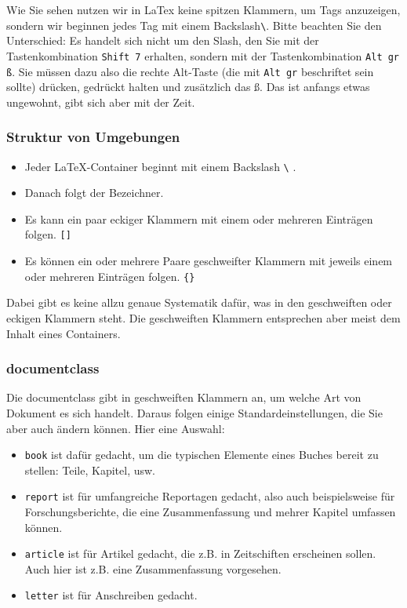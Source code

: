 Wie Sie sehen nutzen wir in LaTex keine spitzen Klammern, um Tags anzuzeigen, sondern wir beginnen jedes \glqq{}Tag\grqq{} mit einem Backslash\verb|\|. Bitte beachten Sie den Unterschied: Es handelt sich nicht um den Slash, den Sie mit der Tastenkombination \verb|Shift 7| erhalten, sondern mit der Tastenkombination \verb|Alt gr ß|. Sie müssen dazu also die rechte Alt-Taste (die mit \verb|Alt gr| beschriftet sein sollte) drücken, gedrückt halten und zusätzlich das ß. Das ist anfangs etwas ungewohnt, gibt sich aber mit der Zeit.\\

\subsubsection{Struktur von Umgebungen}

\begin{itemize}
	\item Jeder LaTeX-Container beginnt mit einem Backslash \verb|\| .
	\item Danach folgt der Bezeichner.
	\item Es kann ein paar eckiger Klammern mit einem oder mehreren Einträgen folgen. \verb|[]|
	\item Es können ein oder mehrere Paare geschweifter Klammern mit jeweils einem oder mehreren Einträgen folgen. \verb|{}|
\end{itemize}

Dabei gibt es keine allzu genaue Systematik dafür, was in den geschweiften oder eckigen Klammern steht. Die geschweiften Klammern entsprechen aber meist dem Inhalt eines Containers.\\

\subsubsection{documentclass}

Die documentclass gibt in geschweiften Klammern an, um welche Art von Dokument es sich handelt. Daraus folgen einige Standardeinstellungen, die Sie aber auch ändern können. Hier eine Auswahl:

\begin{itemize}
	\item \verb|book| ist dafür gedacht, um die typischen Elemente eines Buches bereit zu stellen: Teile, Kapitel, usw.
	\item \verb|report| ist für umfangreiche Reportagen gedacht, also auch beispielsweise für Forschungsberichte, die eine Zusammenfassung und mehrer Kapitel umfassen können.
	\item \verb|article| ist für Artikel gedacht, die z.B. in Zeitschiften erscheinen sollen. Auch hier ist z.B. eine Zusammenfassung vorgesehen.
	\item \verb|letter| ist für Anschreiben gedacht.
\end{itemize}

